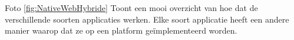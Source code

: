 Foto \ref{fig:NativeWebHybride} Toont een mooi overzicht van hoe dat de verschillende 
soorten applicaties werken. Elke soort applicatie heeft een andere manier waarop dat ze 
op een platform geïmplementeerd worden.




